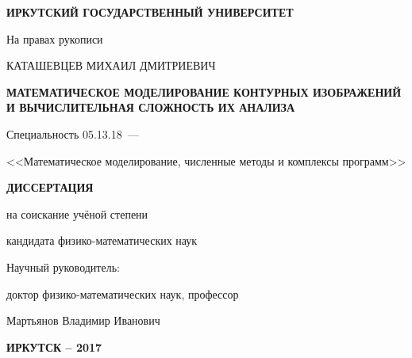 \thispagestyle{empty}

\begin{center}
\MakeTextUppercase{\bf Иркутский государственный университет}
\par
\end{center}

\vspace{5mm}
\begin{flushright}
На правах рукописи

\end{flushright}

\vspace{10mm}
\begin{center}
{\large КАТАШЕВЦЕВ МИХАИЛ ДМИТРИЕВИЧ}
\end{center}

\vspace{5mm}
\begin{center}
{\bf \large \MakeTextUppercase{Математическое моделирование контурных изображений и вычислительная сложность их анализа
}
\par}

\vspace{10mm}
{%
Специальность 05.13.18~---

<<Математическое моделирование, численные методы и комплексы программ>>
}

\vspace{10mm}
\textbf{\MakeTextUppercase{Диссертация}}

на соискание учёной степени

кандидата физико-математических наук
\end{center}

\vspace{20mm}
\begin{flushright}
Научный руководитель:

доктор физико-математических наук, профессор

Мартьянов Владимир Иванович

\end{flushright}

\vspace{20mm}
\begin{center}
\textbf{\MakeTextUppercase{Иркутск -- 2017}}
\end{center}

\newpage